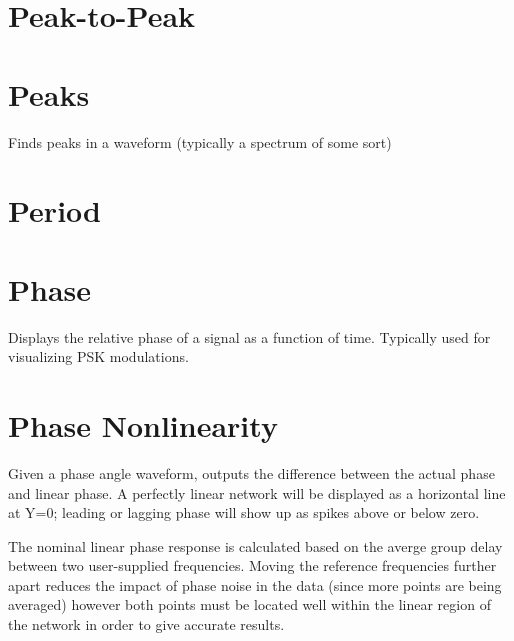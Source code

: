 \pagebreak
\section{Peak-to-Peak}

\pagebreak
\section{Peaks}

Finds peaks in a waveform (typically a spectrum of some sort)

\pagebreak
\section{Period}

\pagebreak
\section{Phase}

Displays the relative phase of a signal as a function of time. Typically used for visualizing PSK modulations.

\pagebreak
\section{Phase Nonlinearity}

Given a phase angle waveform, outputs the difference between the actual phase and linear phase. A perfectly linear
network will be displayed as a horizontal line at Y=0; leading or lagging phase will show up as spikes above or below
zero.

The nominal linear phase response is calculated based on the averge group delay between two user-supplied frequencies.
Moving the reference frequencies further apart reduces the impact of phase noise in the data (since more points are
being averaged) however both points must be located well within the linear region of the network in order to give
accurate results.


